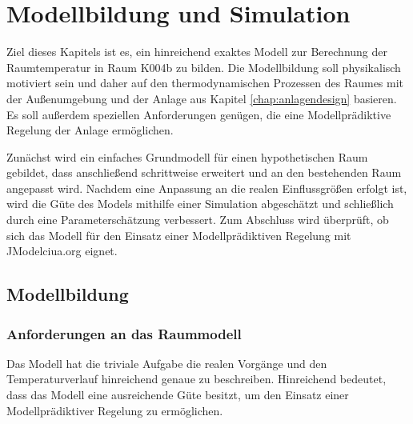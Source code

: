 %
%

\renewcommand{\chapterheadstartvskip}{\vspace*{2cm}}

\chapter{Modellbildung und Simulation}
\label{chap:modellbildung}

Ziel dieses Kapitels ist es, ein hinreichend exaktes Modell zur Berechnung der Raumtemperatur in  Raum K004b zu bilden. Die Modellbildung soll physikalisch motiviert sein und daher auf den thermodynamischen Prozessen des Raumes mit der Außenumgebung und der Anlage aus Kapitel \ref{chap:anlagendesign} basieren. Es soll außerdem speziellen Anforderungen genügen, die eine Modellprädiktive Regelung der Anlage ermöglichen.

Zunächst wird ein einfaches Grundmodell für einen hypothetischen Raum gebildet, dass anschließend schrittweise erweitert und an den bestehenden Raum angepasst wird. Nachdem eine Anpassung an die realen Einflussgrößen erfolgt ist, wird die Güte des Models mithilfe einer Simulation abgeschätzt und schließlich durch eine Parameterschätzung verbessert. Zum Abschluss wird überprüft, ob sich das Modell für den Einsatz einer Modellprädiktiven Regelung mit JModelciua.org eignet.


\section{Modellbildung}

\subsection{Anforderungen an das Raummodell}

Das Modell hat die triviale Aufgabe die realen Vorgänge und den Temperaturverlauf hinreichend genaue zu beschreiben. Hinreichend bedeutet, dass das Modell eine ausreichende Güte besitzt, um den Einsatz einer Modellprädiktiver Regelung zu ermöglichen. 

